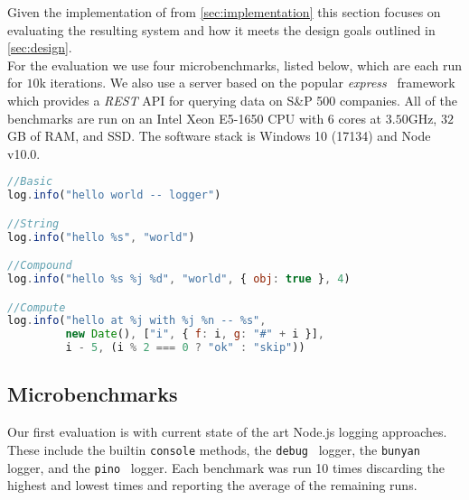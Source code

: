 Given the implementation of \projn from \autoref{sec:implementation} this section
focuses on evaluating the resulting system and how it meets the design goals outlined in \autoref{sec:design}.\\

For the evaluation we use four microbenchmarks, listed below, which are each run for $10$k iterations. 
We also use a server based on the popular \emph{express}~\cite{express} framework 
which provides a \emph{REST} API for querying data on S\&P 500 companies.
All of the benchmarks are run on an Intel Xeon E5-1650 CPU with $6$ cores at $3.50$GHz, 
$32$GB of RAM, and SSD. The software stack is Windows 10 (17134) and Node v10.0.\\


\begin{lstlisting}[language=JavaScript,basicstyle=\scriptsize,numbers=none]
//Basic
log.info("hello world -- logger")

//String
log.info("hello %s", "world")

//Compound
log.info("hello %s %j %d", "world", { obj: true }, 4)

//Compute
log.info("hello at %j with %j %n -- %s", 
         new Date(), ["i", { f: i, g: "#" + i }], 
         i - 5, (i % 2 === 0 ? "ok" : "skip"))
\end{lstlisting}

\subsection{Microbenchmarks}
Our first evaluation is with current state of the art Node.js logging approaches. 
These include the builtin \texttt{console} methods, the \texttt{debug}~\cite{debuglogger} 
logger, the \texttt{bunyan}~\cite{bunyan} logger, and the \texttt{pino}~\cite{pino} logger.
Each benchmark was run 10 times discarding the highest and lowest times and reporting the 
average of the remaining runs.

